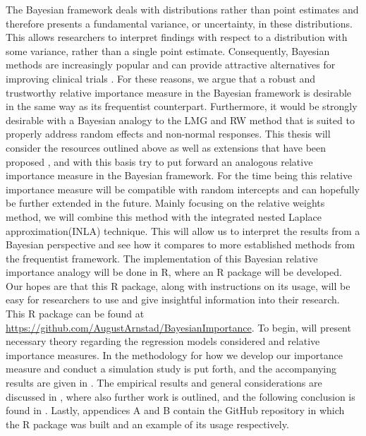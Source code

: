 The Bayesian framework deals with distributions rather than point estimates and therefore presents a fundamental variance, or uncertainty, in these distributions.
This allows researchers to interpret findings with respect to a distribution with some variance, rather than a single point estimate.
Consequently, Bayesian methods are increasingly popular \citep{hackenberger2019bayes} and can provide attractive alternatives for improving clinical trials \citep{lee2012bayesian}.
For these reasons, we argue that a robust and trustworthy relative importance measure in the Bayesian framework is desirable in the same way as its frequentist counterpart.
Furthermore, it would be strongly desirable with a Bayesian analogy to the LMG and RW method that is suited to properly address random effects and non-normal responses.
\newline
\newline
This thesis will consider the resources outlined above as well as extensions that have been proposed \citep{matre}, and with this basis try to put forward an analogous relative importance measure in the Bayesian framework.
For the time being this relative importance measure will be compatible with random intercepts and can hopefully be further extended in the future.
Mainly focusing on the relative weights method, we will combine this method with the integrated nested Laplace approximation(INLA) technique.
This will allow us to interpret the results from a Bayesian perspective and see how it compares to more established methods from the frequentist framework.
The implementation of this Bayesian relative importance analogy will be done in R, where an R package will be developed.
Our hopes are that this R package, along with instructions on its usage, will be easy for researchers to use and give insightful information into their research.
This R package can be found at \url{https://github.com/AugustArnstad/BayesianImportance}.
\newline 
\newline 
To begin,  will present necessary theory regarding the regression models considered and relative importance measures. 
In  the methodology for how we develop our importance measure and conduct a simulation study is put forth, and the accompanying results are given in .
The empirical results and general considerations are discussed in , where also further work is outlined, and the following conclusion is found in .
Lastly, appendices A and B contain the GitHub repository in which the R package was built and an example of its usage respectively.






